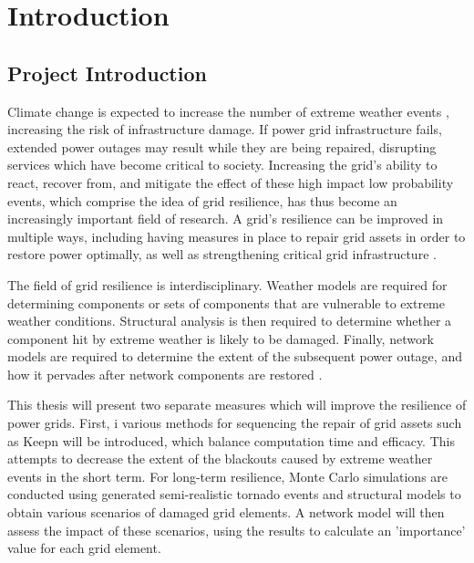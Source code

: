 \documentclass[12pt]{article}
\begin{document}
\newpage

\tableofcontents

\newpage

\listoffigures

\newpage
{}
\section{Introduction}
\subsection{Project Introduction}
Climate change is expected to increase the number of extreme weather events \cite{cheng}, increasing the risk of infrastructure damage. If power grid infrastructure fails, extended power outages may result while they are being repaired, disrupting services which have become critical to society. Increasing the grid’s ability to react, recover from, and mitigate the effect of these high impact low probability events, which comprise the idea of grid resilience, has thus become an increasingly important field of research. A grid’s resilience can be improved in multiple ways, including having measures in place to repair grid assets in order to restore power optimally, as well as strengthening critical grid infrastructure \cite{panteli}. \par
The field of grid resilience is interdisciplinary. Weather models are required for determining components or sets of components that are vulnerable to extreme weather conditions. Structural analysis is then required to determine whether a component hit by extreme weather is likely to be damaged. Finally, network models are required to determine the extent of the subsequent power outage, and how it pervades after network components are restored \cite{panteli}. \par
This thesis will present two separate measures which will improve the resilience of power grids. First, i various methods for sequencing the repair of grid assets such as Keepn will be introduced, which balance computation time and efficacy. This attempts to decrease the extent of the blackouts caused by extreme weather events in the short term. For long-term resilience, Monte Carlo simulations are conducted using generated semi-realistic tornado events and structural models to obtain various scenarios of damaged grid elements. A network model will then assess the impact of these scenarios, using the results to calculate an 'importance' value for each grid element.
\end{document}
